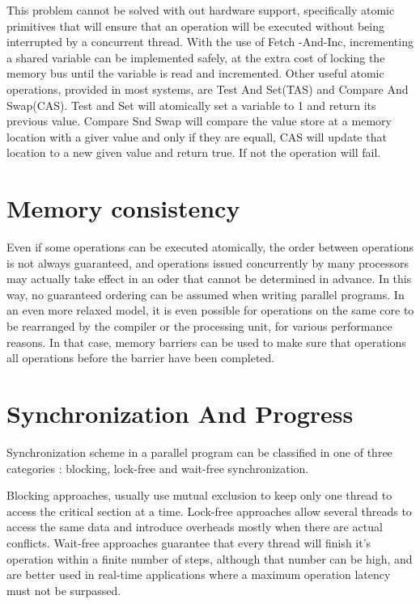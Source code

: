 This problem cannot be solved with out hardware support, specifically atomic primitives that will ensure that an operation will be executed without being interrupted by a concurrent thread.  With the use of Fetch -And-Inc, incrementing a shared variable can be implemented safely, at the extra cost of locking  the memory bus until the variable is read and incremented. Other useful atomic operations, provided in most systems, are Test And Set(TAS) and Compare And Swap(CAS). Test and Set will atomically set a variable to 1 and return its previous value. Compare Snd Swap will compare the value store at a memory location with a giver value and only if they are equall, CAS will update that location to a new given value and return true. If not the operation will fail.

\section{Memory consistency}

Even if some operations can be executed atomically, the order between operations is not always guaranteed, and operations issued concurrently by many processors may actually take effect in an oder that cannot be determined in advance. In this way, no guaranteed ordering can be assumed when writing parallel programs. In an even more relaxed model, it is even possible for operations on the same core to be rearranged by the compiler or the processing unit, for various performance reasons. In that case, memory barriers can be used to make sure that operations all operations before the barrier have been completed.
\section{Synchronization And Progress}

Synchronization scheme in a parallel program  can be classified in one of three categories : blocking, lock-free and wait-free synchronization.

Blocking approaches, usually use mutual exclusion to keep only one thread to access the critical section at a time. Lock-free approaches allow several threads to access the same data and introduce overheads mostly when there are actual conflicts. Wait-free approaches guarantee that every thread will finish it's operation within a finite number of steps, although that number can be high, and are better used in real-time applications where a maximum operation latency must not be surpassed. 
 
